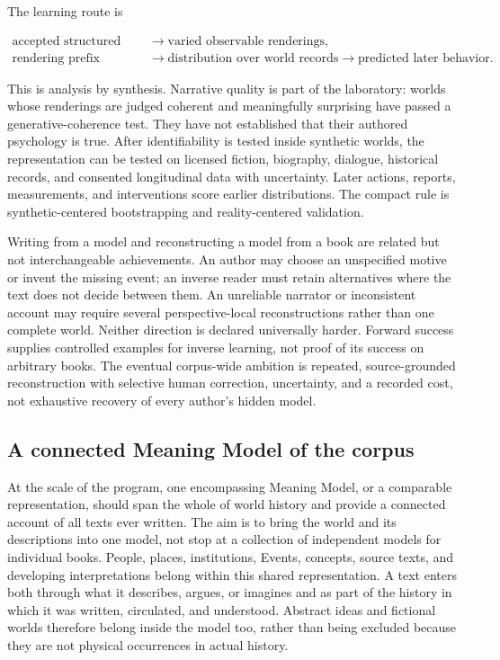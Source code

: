 \documentclass[10pt]{article}
\begin{document}
The learning route is

\begin{equation}
 \begin{aligned}
  \text{accepted structured world}
  &\rightarrow\text{varied observable renderings},\\
  \text{rendering prefix}
  &\rightarrow\text{distribution over world records}
  \rightarrow\text{predicted later behavior}.
 \end{aligned}
 \label{eq:generative-inversion-method}
\end{equation}

This is analysis by synthesis. Narrative quality is part of the laboratory:
worlds whose renderings are judged coherent and meaningfully surprising have
passed a generative-coherence test. They have not established that their
authored psychology is true. After identifiability is tested inside synthetic
worlds, the representation can be tested on licensed fiction, biography,
dialogue, historical records, and consented longitudinal data with uncertainty.
Later actions, reports, measurements, and interventions score earlier
distributions. The compact rule is synthetic-centered bootstrapping and
reality-centered validation.

Writing from a model and reconstructing a model from a book are related but
not interchangeable achievements. An author may choose an unspecified motive
or invent the missing event; an inverse reader must retain alternatives where
the text does not decide between them. An unreliable narrator or inconsistent
account may require several perspective-local reconstructions rather than one
complete world. Neither direction is declared universally harder. Forward
success supplies controlled examples for inverse learning, not proof of its
success on arbitrary books. The eventual corpus-wide ambition is repeated,
source-grounded reconstruction with selective human correction, uncertainty,
and a recorded cost, not exhaustive recovery of every author's hidden model.

\subsection{A connected Meaning Model of the corpus}
\label{sec:corpus-model}
At the scale of the program, one encompassing Meaning Model, or a comparable
representation, should span the whole of world history and provide a connected
account of all texts ever written. The aim is to bring the world and its
descriptions into one model, not stop at a collection of independent models
for individual books. People, places, institutions, Events, concepts, source
texts, and developing interpretations belong within this shared representation.
A text enters both through what it describes, argues, or imagines and as part
of the history in which it was written, circulated, and understood. Abstract
ideas and fictional worlds therefore belong inside the model too, rather than
being excluded because they are not physical occurrences in actual history.
\end{document}
